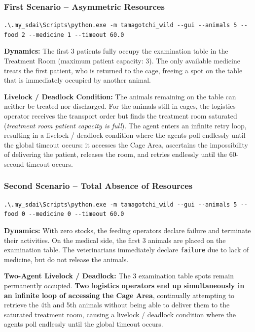 \documentclass{article}
\renewcommand{\_}{\oldtextunderscore\allowbreak}
\begin{document}
\subsubsection{First Scenario  -- Asymmetric Resources}
\begin{lstlisting}[language={}]
.\.my_sdai\Scripts\python.exe -m tamagotchi_wild --gui --animals 5 --food 2 --medicine 1 --timeout 60.0
\end{lstlisting}
\textbf{Dynamics:} The first 3 patients fully occupy the examination table in the Treatment Room (maximum patient capacity: 3). The only available medicine treats the first patient, who is returned to the cage, freeing a spot on the table that is immediately occupied by another animal.

\noindent\textbf{Livelock / Deadlock Condition:} The animals remaining on the table can neither be treated nor discharged. For the animals still in cages, the logistics operator receives the transport order but finds the treatment room saturated (\textit{treatment room patient capacity is full}). The agent enters an infinite retry loop, resulting in a livelock / deadlock condition where the agents poll endlessly until the global timeout occurs: it accesses the Cage Area, ascertains the impossibility of delivering the patient, releases the room, and retries endlessly until the 60-second timeout occurs.

\subsubsection{Second Scenario -- Total Absence of Resources}
\begin{lstlisting}[language={}]
.\.my_sdai\Scripts\python.exe -m tamagotchi_wild --gui --animals 5 --food 0 --medicine 0 --timeout 60.0
\end{lstlisting}
\textbf{Dynamics:} With zero stocks, the feeding operators declare failure and terminate their activities. On the medical side, the first 3 animals are placed on the examination table. The veterinarians immediately declare \texttt{failure} due to lack of medicine, but do not release the animals.

\noindent\textbf{Two-Agent Livelock / Deadlock:} The 3 examination table spots remain permanently occupied. \textbf{Two logistics operators end up simultaneously in an infinite loop of accessing the Cage Area}, continually attempting to retrieve the 4th and 5th animals without being able to deliver them to the saturated treatment room, causing a livelock / deadlock condition where the agents poll endlessly until the global timeout occurs.
\end{document}

